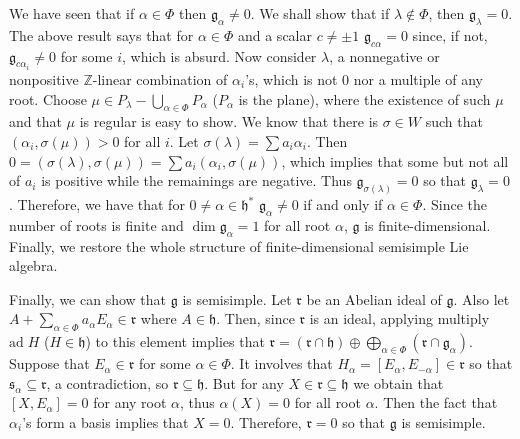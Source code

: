 \documentclass{article}
\newcommand{\InZ}{\mathbb{Z}}
\newcommand{\lie}[1]{\mathfrak{#1}}
\newcommand{\ad}[1]{\mathrm{ad}\; #1}
\begin{document}
We have seen that if $\alpha \in \Phi$ then $\lie{g}_\alpha \ne 0$.
We shall show that if $\lambda \notin \Phi$, then $\lie{g}_\lambda = 0$.
The above result says that for $\alpha \in \Phi$ and a scalar $c \ne \pm 1$ $\lie{g}_{c\alpha} = 0$ since, if not, $\lie{g}_{c\alpha_i} \ne 0$ for some $i$, which is absurd.
Now consider $\lambda$, a nonnegative or nonpositive $\InZ$-linear combination of $\alpha_i$'s, which is not 0 nor a multiple of any root.
Choose $\mu \in P_\lambda - \bigcup_{\alpha \in \Phi} P_\alpha$ ($P_\alpha$ is the plane), where the existence of such $\mu$ and that $\mu$ is regular is easy to show.
We know that there is $\sigma \in W$ such that $(\alpha_i, \sigma(\mu)) > 0$ for all $i$.
Let $\sigma(\lambda) = \sum a_i \alpha_i$.
Then $0 = (\sigma(\lambda), \sigma(\mu)) = \sum a_i (\alpha_i, \sigma(\mu))$, which implies that some but not all of $a_i$ is positive while the remainings are negative.
Thus $\lie{g}_{\sigma(\lambda)} = 0$ so that $\lie{g}_\lambda = 0$.
Therefore, we have that for $0 \ne \alpha \in \lie{h}^*$ $\lie{g}_\alpha \ne 0$ if and only if $\alpha \in \Phi$.
Since the number of roots is finite and $\dim{\lie{g}_\alpha} = 1$ for all root $\alpha$, $\lie{g}$ is finite-dimensional.
Finally, we restore the whole structure of finite-dimensional semisimple Lie algebra.

Finally, we can show that $\lie{g}$ is semisimple.
Let $\lie{r}$ be an Abelian ideal of $\lie{g}$.
Also let $A + \sum_{\alpha \in \Phi} a_\alpha E_\alpha \in \lie{r}$ where $A \in \lie{h}$.
Then, since $\lie{r}$ is an ideal, applying multiply $\ad{H}$ ($H \in \lie{h}$) to this element implies that $\lie{r} = (\lie{r} \cap \lie{h}) \oplus \bigoplus_{\alpha \in \Phi} (\lie{r} \cap \lie{g}_\alpha)$.
Suppose that $E_\alpha \in \lie{r}$ for some $\alpha \in \Phi$.
It involves that $H_\alpha = [E_\alpha, E_{-\alpha}] \in \lie{r}$ so that $\lie{s}_\alpha \subseteq \lie{r}$, a contradiction, so $\lie{r} \subseteq \lie{h}$.
But for any $X \in \lie{r} \subseteq \lie{h}$ we obtain that $[X, E_\alpha] = 0$ for any root $\alpha$, thus $\alpha(X) = 0$ for all root $\alpha$.
Then the fact that $\alpha_i$'s form a basis implies that $X = 0$.
Therefore, $\lie{r} = 0$ so that $\lie{g}$ is semisimple.
\end{document}
